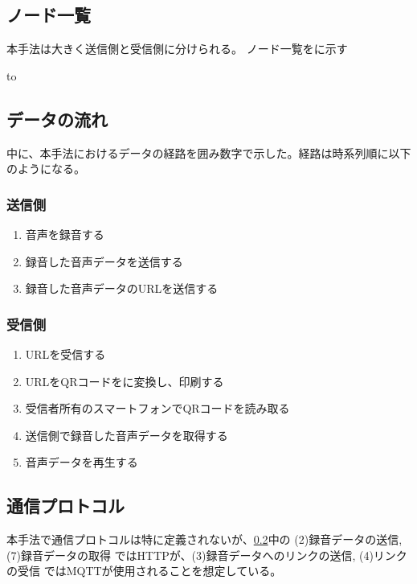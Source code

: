 \documentclass[submit,techrep,noauthor]{ipsj}
\begin{document}
\subsection{ノード一覧}
本手法は大きく送信側と受信側に分けられる。
ノード一覧をに示す

\begin{table}[tb] 
\caption{ノード一覧} 
\label{tab:sys-nodes}
\hbox to
\end{table}

\subsection{データの流れ}
\label{dataflow}
中に、本手法におけるデータの経路を囲み数字で示した。経路は時系列順に以下のようになる。
\subsubsection*{送信側}
\begin{enumerate}
    \item 音声を録音する
    \item 録音した音声データを送信する
    \item 録音した音声データのURLを送信する 
\end{enumerate}

\subsubsection*{受信側}
\begin{enumerate}
    \item URLを受信する 
    \item URLをQRコードをに変換し、印刷する 
    \item 受信者所有のスマートフォンでQRコードを読み取る 
    \item 送信側で録音した音声データを取得する 
    \item 音声データを再生する       
\end{enumerate}


\subsection{通信プロトコル}
本手法で通信プロトコルは特に定義されないが、\ref{dataflow}中の (2)録音データの送信, (7)録音データの取得 ではHTTPが、(3)録音データへのリンクの送信, (4)リンクの受信 ではMQTTが使用されることを想定している。
\end{document}

